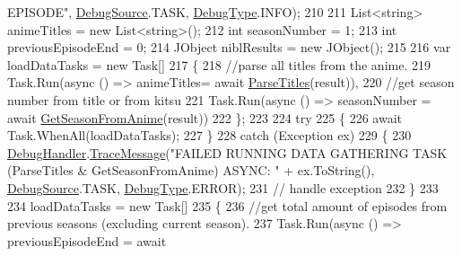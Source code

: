 \begin{DoxyCode}
{       EPISODE"}, \mbox{\hyperlink{namespace_little_weeb_library_1_1_handlers_a2a6ca0775121c9c503d58aa254d292be}{DebugSource}}.TASK, \mbox{\hyperlink{namespace_little_weeb_library_1_1_handlers_ab66019ed40462876ec4e61bb3ccb0a62}{DebugType}}.INFO);
210 
211                     List<string> animeTitles = \textcolor{keyword}{new} List<string>();
212                     \textcolor{keywordtype}{int} seasonNumber = 1;
213                     \textcolor{keywordtype}{int} previousEpisodeEnd = 0;
214                     JObject niblResults = \textcolor{keyword}{new} JObject();
215 
216                     var loadDataTasks = \textcolor{keyword}{new} Task[]
217                     \{ 
218                         \textcolor{comment}{//parse all titles from the anime.}
219                         Task.Run(async () => animeTitles= await \mbox{\hyperlink{class_little_weeb_library_1_1_handlers_1_1_anime_profile_handler_a4796da2a058bbc1efe2ee8f31b6a9b4d}{ParseTitles}}(result)),
220                         \textcolor{comment}{//get season number from title or from kitsu}
221                         Task.Run(async () => seasonNumber = await 
      \mbox{\hyperlink{class_little_weeb_library_1_1_handlers_1_1_anime_profile_handler_ad7341acd9da86cd5cee9a45b0a41f887}{GetSeasonFromAnime}}(result))
222                     \};
223 
224                     \textcolor{keywordflow}{try}
225                     \{
226                         await Task.WhenAll(loadDataTasks);
227                     \}
228                     \textcolor{keywordflow}{catch} (Exception ex)
229                     \{
230                         \mbox{\hyperlink{class_little_weeb_library_1_1_handlers_1_1_anime_profile_handler_a0b0ae3c3838d26351485e6dfc566a632}{DebugHandler}}.\mbox{\hyperlink{interface_little_weeb_library_1_1_handlers_1_1_i_debug_handler_a2e405bc3492e683cd3702fae125221bc}{TraceMessage}}(\textcolor{stringliteral}{"FAILED RUNNING DATA GATHERING
       TASK (ParseTitles & GetSeasonFromAnime) ASYNC: "} + ex.ToString(), \mbox{\hyperlink{namespace_little_weeb_library_1_1_handlers_a2a6ca0775121c9c503d58aa254d292be}{DebugSource}}.TASK, 
      \mbox{\hyperlink{namespace_little_weeb_library_1_1_handlers_ab66019ed40462876ec4e61bb3ccb0a62}{DebugType}}.ERROR);
231                         \textcolor{comment}{// handle exception}
232                     \}
233 
234                     loadDataTasks = \textcolor{keyword}{new} Task[]
235                     \{
236                     \textcolor{comment}{//get total amount of episodes from previous seasons (excluding current season).}
237                     Task.Run(async () => previousEpisodeEnd = await 

\end{DoxyCode}
